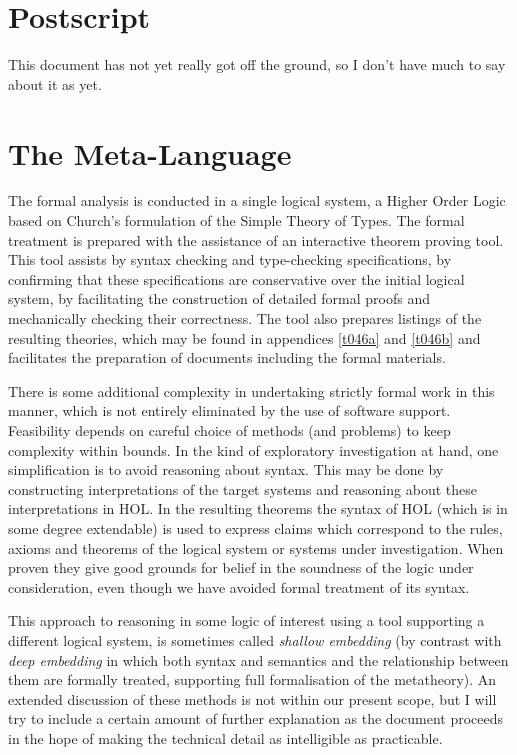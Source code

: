 
\section{Postscript}\label{POSTSCRIPT}

This document has not yet really got off the ground, so I don't have much to say about it as yet.

\pagebreak

\appendix

\section{The Meta-Language}

The formal analysis is conducted in a single logical system, a Higher Order Logic based on Church's formulation of the Simple Theory of Types\cite{church40}.
The formal treatment is prepared with the assistance of an interactive theorem proving tool.
This tool assists by syntax checking and type-checking specifications, by confirming that these specifications are conservative over the initial logical system, by facilitating the construction of detailed formal proofs and mechanically checking their correctness.
The tool also prepares listings of the resulting theories, which may be found in appendices \ref{t046a} and \ref{t046b} and facilitates the preparation of documents including the formal materials.

There is some additional complexity in undertaking strictly formal work in this manner, which is not entirely eliminated by the use of software support.
Feasibility depends on careful choice of methods (and problems) to keep complexity within bounds.
In the kind of exploratory investigation at hand, one simplification is to avoid reasoning about syntax.
This may be done by constructing interpretations of the target systems and reasoning about these interpretations in HOL.
In the resulting theorems the syntax of HOL (which is in some degree extendable) is used to express claims which correspond to the rules, axioms and theorems of the logical system or systems under investigation.
When proven they give good grounds for belief in the soundness of the logic under consideration, even though we have avoided formal treatment of its syntax.

This approach to reasoning in some logic of interest using a tool supporting a different logical system, is sometimes called \emph{shallow embedding} (by contrast with \emph{deep embedding} in which both syntax and semantics and the relationship between them are formally treated, supporting full formalisation of the metatheory).
An extended discussion of these methods is not within our present scope, but I will try to include a certain amount of further explanation as the document proceeds in the hope of making the technical detail as intelligible as practicable.

